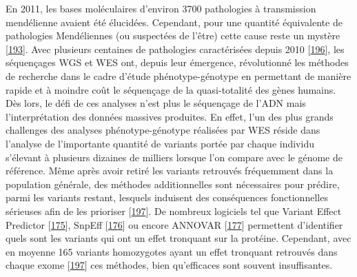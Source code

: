 \documentclass[12pt,a4paper,twoside]{ugathesis}
\theoremstyle{definition}
\theoremstyle{definition}
\theoremstyle{definition}
\theoremstyle{remark}
\begin{document}
En 2011, les bases moléculaires d'environ 3700 pathologies à
transmission mendélienne avaient été élucidées. Cependant, pour une
quantité équivalente de pathologies Mendéliennes (ou suspectées de
l'être) cette cause reste un mystère
{[}\protect\hyperlink{ref-Amberger2011}{193}{]}. Avec plusieurs
centaines de pathologies caractérisées depuis 2010
{[}\protect\hyperlink{ref-Ng}{196}{]}, les séquençages WGS et WES ont,
depuis leur émergence, révolutionné les méthodes de recherche dans le
cadre d'étude phénotype-génotype en permettant de manière rapide et à
moindre coût le séquençage de la quasi-totalité des gènes humains. Dès
lors, le défi de ces analyses n'est plus le séquençage de l'ADN mais
l'interprétation des données massives produites. En effet, l'un des plus
grands challenges des analyses phénotype-génotype réalisées par WES
réside dans l'analyse de l'importante quantité de variants portée par
chaque individu s'élevant à plusieurs dizaines de milliers lorsque l'on
compare avec le génome de référence. Même après avoir retiré les
variants retrouvés fréquemment dans la population générale, des méthodes
additionnelles sont nécessaires pour prédire, parmi les variants
restant, lesquels induisent des conséquences fonctionnelles sérieuses
afin de les prioriser {[}\protect\hyperlink{ref-Pelak2010}{197}{]}. De
nombreux logiciels tel que Variant Effect Predictor
{[}\protect\hyperlink{ref-McLaren2016}{175}{]}, SnpEff
{[}\protect\hyperlink{ref-Cingolani2012}{176}{]} ou encore ANNOVAR
{[}\protect\hyperlink{ref-Wang2010}{177}{]} permettent d'identifier
quels sont les variants qui ont un effet tronquant sur la protéine.
Cependant, avec en moyenne 165 variants homozygotes ayant un effet
tronquant retrouvés dans chaque exome
{[}\protect\hyperlink{ref-Pelak2010}{197}{]} ces méthodes, bien
qu'efficaces sont souvent insuffisantes.
\end{document}
